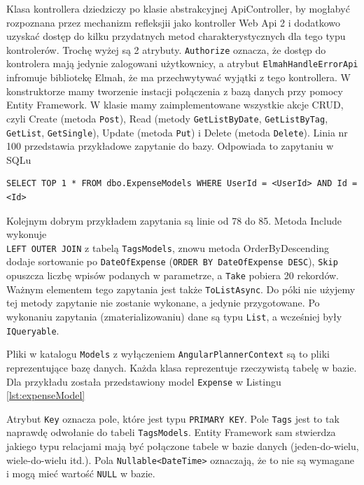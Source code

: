 \documentclass[10pt,titlepage]{article}
\begin{document}

\par Klasa kontrollera dziedziczy po klasie abstrakcyjnej ApiController, by mogłabyć rozpoznana przez mechanizm refleksjii jako kontroller Web Api 2 i dodatkowo uzyskać dostęp do kilku przydatnych metod charakterystycznych dla tego typu kontrolerów. Trochę wyżej są 2 atrybuty. \verb|Authorize| oznacza, że dostęp do kontrolera mają jedynie zalogowani użytkownicy, a atrybut \verb|ElmahHandleErrorApi| infromuje bibliotekę Elmah, że ma przechwytywać wyjątki z tego kontrollera. W konstruktorze mamy tworzenie instacji połączenia z bazą danych przy pomocy Entity Framework. W klasie mamy zaimplementowane wszystkie akcje CRUD, czyli Create (metoda \verb|Post|), Read (metody \verb|GetListByDate|, \verb|GetListByTag|, \verb|GetList|, \verb|GetSingle|), Update (metoda \verb|Put|) i Delete (metoda \verb|Delete|). Linia nr 100 przedstawia przykładowe zapytanie do bazy. Odpowiada to zapytaniu w SQLu
\begin{verbatim}
SELECT TOP 1 * FROM dbo.ExpenseModels WHERE UserId = <UserId> AND Id = <Id>
\end{verbatim}
Kolejnym dobrym przykładem zapytania są linie od 78 do 85. Metoda Include wykonuje\\ \verb|LEFT OUTER JOIN| z tabelą \verb|TagsModels|, znowu metoda OrderByDescending dodaje sortowanie po \verb|DateOfExpense| (\verb|ORDER BY DateOfExpense DESC|), \verb|Skip| opuszcza liczbę wpisów podanych w parametrze, a \verb|Take| pobiera 20 rekordów. Ważnym elementem tego zapytania jest także \verb|ToListAsync|. Do póki nie użyjemy tej metody zapytanie nie zostanie wykonane, a jedynie przygotowane. Po wykonaniu zapytania (zmaterializowaniu) dane są typu \verb|List|, a wcześniej były \verb|IQueryable|.

\par Pliki w katalogu \verb|Models| z wyłączeniem \verb|AngularPlannerContext| są to pliki reprezentujące bazę danych. Każda klasa reprezentuje rzeczywistą tabelę w bazie. Dla przykładu została przedstawiony model \verb|Expense| w Listingu \ref{lst:expenseModel}

Atrybut \verb|Key| oznacza pole, które jest typu \verb|PRIMARY KEY|. Pole \verb|Tags| jest to tak naprawdę odwołanie do tabeli \verb|TagsModels|. Entity Framework sam stwierdza jakiego typu relacjami mają być połączone tabele w bazie danych (jeden-do-wielu, wiele-do-wielu itd.). Pola \verb|Nullable<DateTime>| oznaczają, że to nie są wymagane i mogą mieć wartość \verb|NULL| w bazie.
\end{document}
